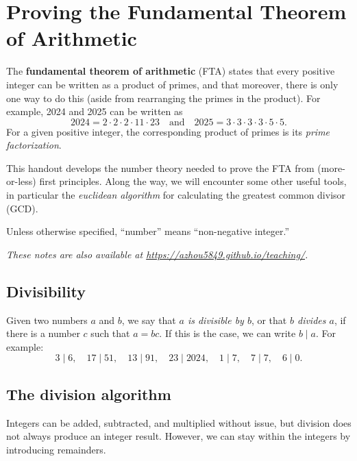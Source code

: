 \section{Proving the Fundamental Theorem of Arithmetic}

The \textbf{fundamental theorem of arithmetic} (FTA) states that every positive integer can be written as a product of primes, and that moreover, there is only one way to do this (aside from rearranging the primes in the product). For example, 2024 and 2025 can be written as
\begin{equation*}
2024 = 2\cdot 2\cdot 2\cdot 11\cdot 23\quad\text{and}\quad 2025 = 3\cdot 3\cdot 3\cdot 3\cdot 5\cdot 5.
\end{equation*}
For a given positive integer, the corresponding product of primes is its \emph{prime factorization}.

This handout develops the number theory needed to prove the FTA from (more-or-less) first principles. Along the way, we will encounter some other useful tools, in particular the \emph{euclidean algorithm} for calculating the greatest common divisor (GCD).

\begin{convention}
Unless otherwise specified, ``number'' means ``non-negative integer.''
\end{convention}

\textit{These notes are also available at \url{https://azhou5849.github.io/teaching/}.}


\subsection{Divisibility}

Given two numbers $a$ and $b$, we say that \emph{$a$ is divisible by $b$}, or that \emph{$b$ divides $a$}, if there is a number $c$ such that $a = bc$. If this is the case, we can write $b\mid a$. For example:
\begin{equation*} 
3\mid 6,\quad 17\mid 51,\quad 13\mid 91,\quad 23\mid 2024,\quad 1\mid 7,\quad 7\mid 7,\quad 6\mid 0.
\end{equation*}




\subsection{The division algorithm}

Integers can be added, subtracted, and multiplied without issue, but division does not always produce an integer result. However, we can stay within the integers by introducing remainders.

